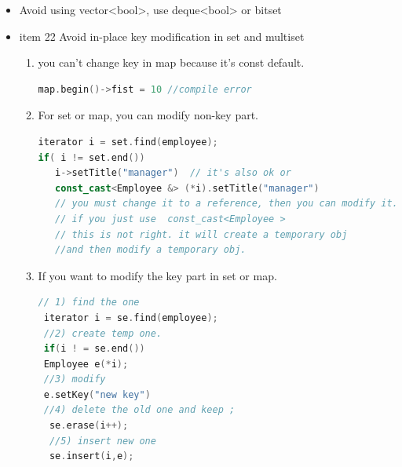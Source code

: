 \documentclass[a4paper,12pt,twoside]{book}
\begin{document}
\begin{itemize}
\item Avoid using vector<bool>, use deque<bool> or bitset


\item item 22 Avoid in-place key modification in set and multiset
\begin{enumerate}
   \item you can't change key in map because it's const default.
\begin{lstlisting}[frame=single, language=c++]
map.begin()->fist = 10 //compile error
\end{lstlisting}

   \item For set or map, you can modify non-key part.
\begin{lstlisting}[frame=single, language=c++]
iterator i = set.find(employee);
if( i != set.end())
   i->setTitle("manager")  // it's also ok or
   const_cast<Employee &> (*i).setTitle("manager")
   // you must change it to a reference, then you can modify it.
   // if you just use  const_cast<Employee >
   // this is not right. it will create a temporary obj
   //and then modify a temporary obj.
\end{lstlisting}

\item If you want to modify the key part in set or map.
\begin{lstlisting}[frame=single, language=c++]
 // 1) find the one
 iterator i = se.find(employee);
 //2) create temp one.
 if(i ! = se.end())
 Employee e(*i);
 //3) modify
 e.setKey("new key")
 //4) delete the old one and keep ;
  se.erase(i++);
  //5) insert new one
  se.insert(i,e);
\end{lstlisting}
    \end{enumerate}


\end{itemize}
\end{document}

